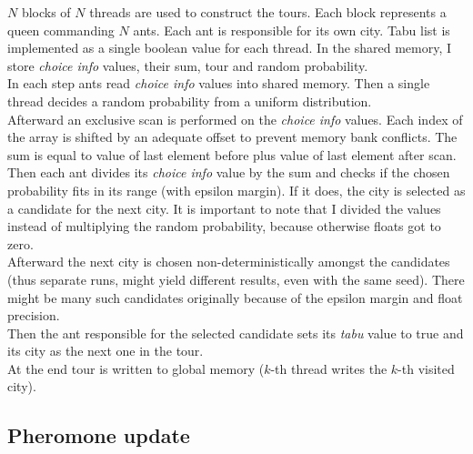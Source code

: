 \documentclass[12pt, a4paper]{article}
\begin{document}
$N$ blocks of $N$ threads are used to construct the tours. Each block
represents a queen commanding $N$ ants. Each ant is responsible for its own
city. Tabu list is implemented as a single boolean value for each thread. In
the shared memory, I store \emph{choice info} values, their sum, tour and
random probability.\\
In each step ants read \emph{choice info} values into shared memory. Then a
single thread decides a random probability from a uniform distribution.\\
Afterward an exclusive scan is performed on the \emph{choice info} values.
Each index of the array is shifted by an adequate offset to prevent memory bank
conflicts. The sum is equal to value of last element before plus value of last
element after scan.\\
Then each ant divides its \emph{choice info} value by the sum and checks if the
chosen probability fits in its range (with epsilon margin). If it does, the
city is selected as a candidate for the next city. It is important to note that
I divided the values instead of multiplying the random probability, because
otherwise floats got to zero.\\
Afterward the next city is chosen non-deterministically amongst the candidates
(thus separate runs, might yield different results, even with the same seed).
There might be many such candidates originally because of the epsilon margin
and float precision.\\
Then the ant responsible for the selected candidate sets its \emph{tabu} value
to true and its city as the next one in the tour.\\
At the end tour is written to global memory ($k$-th thread writes the $k$-th
visited city).

\subsection*{Pheromone update}
\end{document}
